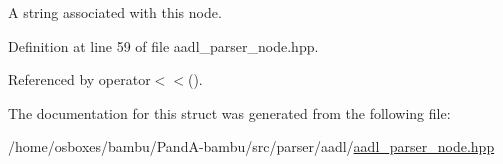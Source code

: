 A string associated with this node. 



Definition at line 59 of file aadl\+\_\+parser\+\_\+node.\+hpp.



Referenced by operator$<$$<$().



The documentation for this struct was generated from the following file\+:\begin{DoxyCompactItemize}
\item 
/home/osboxes/bambu/\+Pand\+A-\/bambu/src/parser/aadl/\hyperlink{aadl__parser__node_8hpp}{aadl\+\_\+parser\+\_\+node.\+hpp}\end{DoxyCompactItemize}

